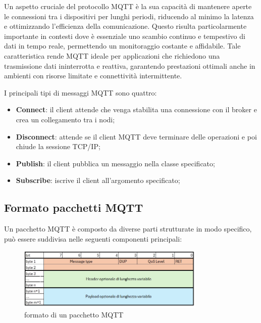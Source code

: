 \documentclass[12pt,a4paper,openright,twoside]{book}
\begin{document}
Un aspetto cruciale del protocollo MQTT è la sua capacità di mantenere aperte le connessioni tra i dispositivi per lunghi periodi, riducendo al minimo la latenza 
e ottimizzando l'efficienza della comunicazione. Questo risulta particolarmente importante in contesti dove è essenziale uno scambio continuo e tempestivo di dati 
in tempo reale, permettendo un monitoraggio costante e affidabile. Tale caratteristica rende MQTT ideale per applicazioni che richiedono una trasmissione dati 
ininterrotta e reattiva, garantendo prestazioni ottimali anche in ambienti con risorse limitate e connettività intermittente.

I principali tipi di messaggi MQTT sono quattro:
\begin{itemize}
    \item \textbf{Connect}: il client attende che venga stabilita una connessione con il broker e crea un collegamento tra i nodi;
    \item \textbf{Disconnect}: attende se il client MQTT deve terminare delle operazioni e poi chiude la sessione TCP/IP;
    \item \textbf{Publish}: il client pubblica un messaggio nella classe specificato;
    \item \textbf{Subscribe}: iscrive il client all’argomento specificato;
\end{itemize}

\subsection{Formato pacchetti MQTT}
Un pacchetto \ac{MQTT} è composto da diverse parti strutturate in modo specifico, può essere suddivisa nelle seguenti componenti principali:

\begin{figure}[h]
    \centering
    \includegraphics[width=0.8\textwidth]{figures/mqtt-packet.png}
    \caption{formato di un pacchetto MQTT}
    \label{fig:mqtt-packet}
\end{figure}
\end{document}
